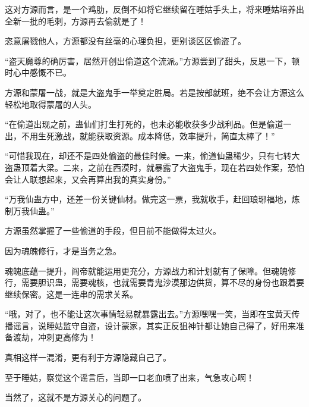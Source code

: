 \begin{this_body}
这对方源而言，是一个鸡肋，反倒不如将它继续留在睡姑手头上，将来睡姑培养出全新一批的毛刺，方源再去偷就是了！

恣意屠戮他人，方源都没有丝毫的心理负担，更别谈区区偷盗了。

“盗天魔尊的确厉害，居然开创出偷道这个流派。”方源尝到了甜头，反思一下，顿时心中感慨不已。

方源和蒙屠一战，就是大盗鬼手一举奠定胜局。若是按部就班，绝不会让方源这么轻松地取得蒙屠的人头。

“在偷道出现之前，蛊仙们打生打死的，也未必能收获多少战利品。但是偷道一出，不用生死激战，就能获取资源。成本降低，效率提升，简直太棒了！”

“可惜我现在，却还不是四处偷盗的最佳时候。一来，偷道仙蛊稀少，只有七转大盗蛊顶着大梁。二来，之前在西漠时，就暴露了大盗鬼手，现在若四处作案，恐怕会让人联想起来，又会再算出我的真实身份。”

“万我仙蛊方中，还差一份关键仙材。做完这一票，我就收手，赶回琅琊福地，炼制万我仙蛊。”

方源虽然掌握了一些偷道的手段，但目前不能做得太过火。

因为魂魄修行，才是当务之急。

魂魄底蕴一提升，阎帝就能运用更充分，方源战力和计划就有了保障。但魂魄修行，需要胆识蛊，需要魂核，也就需要青鬼沙漠那边供货，算不尽的身份也跟着要继续保密。这是一连串的需求关系。

“哦，对了，也不能让这次事情轻易就暴露出去。”方源嘿嘿一笑，当即在宝黄天传播谣言，说睡姑监守自盗，设计蒙家，其实正反狙神针都让她自己得了，好用来准备渡劫，冲刺更高修为！

真相这样一混淆，更有利于方源隐藏自己了。

至于睡姑，察觉这个谣言后，当即一口老血喷了出来，气急攻心啊！

当然了，这就不是方源关心的问题了。

\end{this_body}

